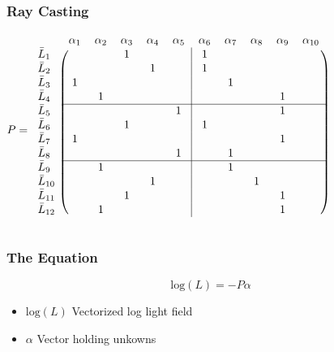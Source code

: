 \documentclass[12pt, compress]{beamer}
\begin{document}
\begin{frame}[fragile]
	\frametitle{Ray Casting}
	$
		P = 
		\begin{blockarray}{lcccccccccc}
		    				& \alpha_1 	& \alpha_2 	& \alpha_3 	& \alpha_4 	& \alpha_5 	& \alpha_6 	& \alpha_7 	& \alpha_8 	& \alpha_9 	& \alpha_{10}	\\
		    \begin{block}{l(ccccc|ccccc@{\hspace*{5pt}})}
			  \bar{L}_1 	& 	 		& 			& 	1		& 			& 			& 	1		&			&			&			&				\\
			  \bar{L}_2 	& 			& 			& 			& 	1		& 			& 	1		&			&			&			&				\\
			  \bar{L}_3 	& 	1		& 			& 			& 			& 			& 			&	1		&			&			&				\\
			  \bar{L}_4 	& 			& 	1		& 			& 			& 			& 			&			&			&	1		&				\\
			  \cline{2-11}
			  \bar{L}_5 	& 			& 			& 			& 			& 	1		& 			&			&			&	1		&				\\
			  \bar{L}_6 	& 			& 			& 	1		& 			& 			& 1			&			&			&			&				\\
			  \bar{L}_7 	& 		1	& 			& 			& 			& 			& 			&			&			&	1		&				\\
			  \bar{L}_8 	& 			& 			& 			& 	 		& 	1		& 			&	1		&			&			&				\\
			  \cline{2-11}
			  \bar{L}_9 	& 			& 	1		& 			& 			& 			& 			&	1		&			& 			&				\\
			  \bar{L}_{10} 	& 			& 			& 			& 		1	& 			& 			&			&	1		&			&				\\
			  \bar{L}_{11} 	& 			& 			& 	1		& 			& 			& 			&			&			&	1		&				\\
			  \bar{L}_{12} 	& 			& 	1		& 			& 	 		& 			& 			&			&			&	1		&				\\			  
		    \end{block}
		\end{blockarray}
	$
\end{frame}

\begin{frame}[fragile]
	\frametitle{The Equation}
	
	\begin{equation*}
		\text{log}(L) = - P \alpha
	\end{equation*}
	
	\begin{itemize}[<alert@+>]
		\item $\text{log}(L)$ Vectorized log light field
		\item $\alpha$ Vector holding unkowns
	\end{itemize}
\end{frame}
\end{document}
